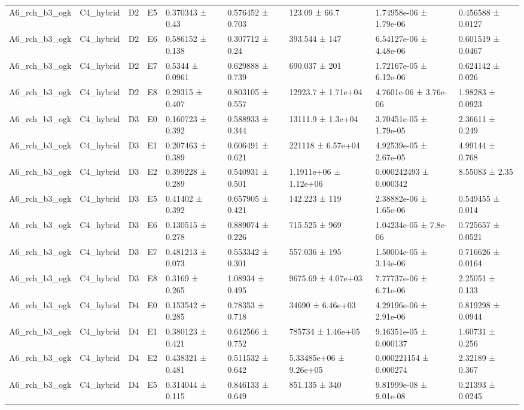\begin{table}
\begin{tabular}{lllllllll}
A6\_rch\_b3\_ogk & C4\_hybrid & D2 & E5 & 0.370343 ± 0.43 & 0.576452 ± 0.703 & 123.09 ± 66.7 & 1.74958e-06 ± 1.79e-06 & 0.456588 ± 0.0127 \\
A6\_rch\_b3\_ogk & C4\_hybrid & D2 & E6 & 0.586152 ± 0.138 & 0.307712 ± 0.24 & 393.544 ± 147 & 6.54127e-06 ± 4.48e-06 & 0.601519 ± 0.0467 \\
A6\_rch\_b3\_ogk & C4\_hybrid & D2 & E7 & 0.5344 ± 0.0961 & 0.629888 ± 0.739 & 690.037 ± 201 & 1.72167e-05 ± 6.12e-06 & 0.624142 ± 0.026 \\
A6\_rch\_b3\_ogk & C4\_hybrid & D2 & E8 & 0.29315 ± 0.407 & 0.803105 ± 0.557 & 12923.7 ± 1.71e+04 & 4.7601e-06 ± 3.76e-06 & 1.98283 ± 0.0923 \\
A6\_rch\_b3\_ogk & C4\_hybrid & D3 & E0 & 0.160723 ± 0.392 & 0.588933 ± 0.344 & 13111.9 ± 1.3e+04 & 3.70451e-05 ± 1.79e-05 & 2.36611 ± 0.249 \\
A6\_rch\_b3\_ogk & C4\_hybrid & D3 & E1 & 0.207463 ± 0.389 & 0.606491 ± 0.621 & 221118 ± 6.57e+04 & 4.92539e-05 ± 2.67e-05 & 4.99144 ± 0.768 \\
A6\_rch\_b3\_ogk & C4\_hybrid & D3 & E2 & 0.399228 ± 0.289 & 0.540931 ± 0.501 & 1.1911e+06 ± 1.12e+06 & 0.000242493 ± 0.000342 & 8.55083 ± 2.35 \\
A6\_rch\_b3\_ogk & C4\_hybrid & D3 & E5 & 0.41402 ± 0.392 & 0.657905 ± 0.421 & 142.223 ± 119 & 2.38882e-06 ± 1.65e-06 & 0.549455 ± 0.014 \\
A6\_rch\_b3\_ogk & C4\_hybrid & D3 & E6 & 0.130515 ± 0.278 & 0.889074 ± 0.226 & 715.525 ± 969 & 1.04234e-05 ± 7.8e-06 & 0.725657 ± 0.0521 \\
A6\_rch\_b3\_ogk & C4\_hybrid & D3 & E7 & 0.481213 ± 0.073 & 0.553342 ± 0.301 & 557.036 ± 195 & 1.50004e-05 ± 3.14e-06 & 0.716626 ± 0.0164 \\
A6\_rch\_b3\_ogk & C4\_hybrid & D3 & E8 & 0.3169 ± 0.265 & 1.08934 ± 0.495 & 9675.69 ± 4.07e+03 & 7.77737e-06 ± 6.71e-06 & 2.25051 ± 0.133 \\
A6\_rch\_b3\_ogk & C4\_hybrid & D4 & E0 & 0.153542 ± 0.285 & 0.78353 ± 0.718 & 34690 ± 6.46e+03 & 4.29196e-06 ± 2.91e-06 & 0.819298 ± 0.0944 \\
A6\_rch\_b3\_ogk & C4\_hybrid & D4 & E1 & 0.380123 ± 0.421 & 0.642566 ± 0.752 & 785734 ± 1.46e+05 & 9.16351e-05 ± 0.000137 & 1.60731 ± 0.256 \\
A6\_rch\_b3\_ogk & C4\_hybrid & D4 & E2 & 0.438321 ± 0.481 & 0.511532 ± 0.642 & 5.33485e+06 ± 9.26e+05 & 0.000221154 ± 0.000274 & 2.32189 ± 0.367 \\
A6\_rch\_b3\_ogk & C4\_hybrid & D4 & E5 & 0.314044 ± 0.115 & 0.846133 ± 0.649 & 851.135 ± 340 & 9.81999e-08 ± 9.01e-08 & 0.21393 ± 0.0245 \\

\end{tabular}
\end{table}
